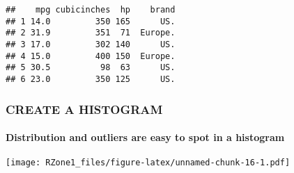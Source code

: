 \documentclass[11pt,]{article}
\newenvironment{Shaded}{\begin{snugshade}}{\end{snugshade}}
\newcommand{\CommentTok}[1]{\textcolor[rgb]{0.56,0.35,0.01}{\textit{#1}}}
\newcommand{\DataTypeTok}[1]{\textcolor[rgb]{0.13,0.29,0.53}{#1}}
\newcommand{\DecValTok}[1]{\textcolor[rgb]{0.00,0.00,0.81}{#1}}
\newcommand{\KeywordTok}[1]{\textcolor[rgb]{0.13,0.29,0.53}{\textbf{#1}}}
\newcommand{\NormalTok}[1]{#1}
\newcommand{\OperatorTok}[1]{\textcolor[rgb]{0.81,0.36,0.00}{\textbf{#1}}}
\newcommand{\StringTok}[1]{\textcolor[rgb]{0.31,0.60,0.02}{#1}}
\let\oldparagraph\paragraph
\renewcommand{\paragraph}[1]{\oldparagraph{#1}\mbox{}}
\begin{document}
\begin{verbatim}
##    mpg cubicinches  hp    brand
## 1 14.0         350 165      US.
## 2 31.9         351  71  Europe.
## 3 17.0         302 140      US.
## 4 15.0         400 150  Europe.
## 5 30.5          98  63      US.
## 6 23.0         350 125      US.
\end{verbatim}

\hypertarget{create-a-histogram}{%
\subsubsection{CREATE A HISTOGRAM}\label{create-a-histogram}}

\hypertarget{distribution-and-outliers-are-easy-to-spot-in-a-histogram}{%
\paragraph{Distribution and outliers are easy to spot in a
histogram}\label{distribution-and-outliers-are-easy-to-spot-in-a-histogram}}

\begin{Shaded}
\end{Shaded}

\texttt{[image: RZone1\_files/figure-latex/unnamed-chunk-16-1.pdf]}
\end{document}

